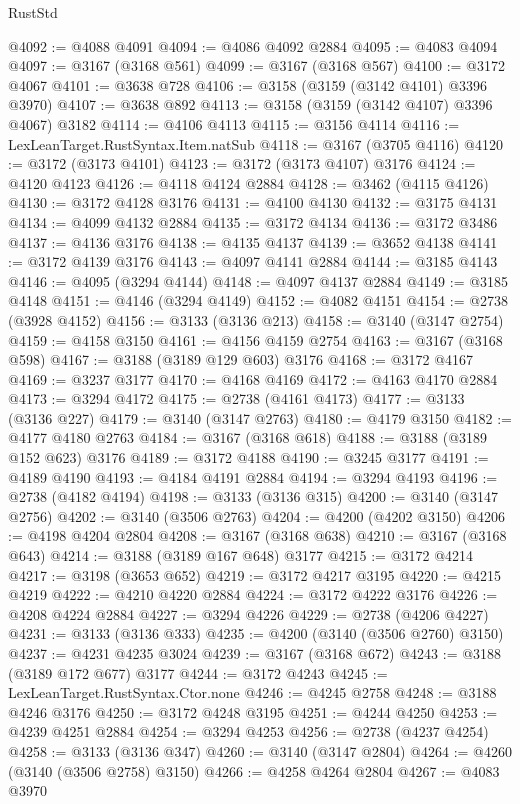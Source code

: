 \begin{lexlean}{RustStd}
\begin{coremodule}
@4092 := @4088 @4091
@4094 := @4086 @4092 @2884
@4095 := @4083 @4094
@4097 := @3167 (@3168 @561)
@4099 := @3167 (@3168 @567)
@4100 := @3172 @4067
@4101 := @3638 @728
@4106 := @3158 (@3159 (@3142 @4101) @3396 @3970)
@4107 := @3638 @892
@4113 := @3158 (@3159 (@3142 @4107) @3396 @4067) @3182
@4114 := @4106 @4113
@4115 := @3156 @4114
@4116 := LexLeanTarget.RustSyntax.Item.natSub
@4118 := @3167 (@3705 @4116)
@4120 := @3172 (@3173 @4101)
@4123 := @3172 (@3173 @4107) @3176
@4124 := @4120 @4123
@4126 := @4118 @4124 @2884
@4128 := @3462 (@4115 @4126)
@4130 := @3172 @4128 @3176
@4131 := @4100 @4130
@4132 := @3175 @4131
@4134 := @4099 @4132 @2884
@4135 := @3172 @4134
@4136 := @3172 @3486
@4137 := @4136 @3176
@4138 := @4135 @4137
@4139 := @3652 @4138
@4141 := @3172 @4139 @3176
@4143 := @4097 @4141 @2884
@4144 := @3185 @4143
@4146 := @4095 (@3294 @4144)
@4148 := @4097 @4137 @2884
@4149 := @3185 @4148
@4151 := @4146 (@3294 @4149)
@4152 := @4082 @4151
@4154 := @2738 (@3928 @4152)
@4156 := @3133 (@3136 @213)
@4158 := @3140 (@3147 @2754)
@4159 := @4158 @3150
@4161 := @4156 @4159 @2754
@4163 := @3167 (@3168 @598)
@4167 := @3188 (@3189 @129 @603) @3176
@4168 := @3172 @4167
@4169 := @3237 @3177
@4170 := @4168 @4169
@4172 := @4163 @4170 @2884
@4173 := @3294 @4172
@4175 := @2738 (@4161 @4173)
@4177 := @3133 (@3136 @227)
@4179 := @3140 (@3147 @2763)
@4180 := @4179 @3150
@4182 := @4177 @4180 @2763
@4184 := @3167 (@3168 @618)
@4188 := @3188 (@3189 @152 @623) @3176
@4189 := @3172 @4188
@4190 := @3245 @3177
@4191 := @4189 @4190
@4193 := @4184 @4191 @2884
@4194 := @3294 @4193
@4196 := @2738 (@4182 @4194)
@4198 := @3133 (@3136 @315)
@4200 := @3140 (@3147 @2756)
@4202 := @3140 (@3506 @2763)
@4204 := @4200 (@4202 @3150)
@4206 := @4198 @4204 @2804
@4208 := @3167 (@3168 @638)
@4210 := @3167 (@3168 @643)
@4214 := @3188 (@3189 @167 @648) @3177
@4215 := @3172 @4214
@4217 := @3198 (@3653 @652)
@4219 := @3172 @4217 @3195
@4220 := @4215 @4219
@4222 := @4210 @4220 @2884
@4224 := @3172 @4222 @3176
@4226 := @4208 @4224 @2884
@4227 := @3294 @4226
@4229 := @2738 (@4206 @4227)
@4231 := @3133 (@3136 @333)
@4235 := @4200 (@3140 (@3506 @2760) @3150)
@4237 := @4231 @4235 @3024
@4239 := @3167 (@3168 @672)
@4243 := @3188 (@3189 @172 @677) @3177
@4244 := @3172 @4243
@4245 := LexLeanTarget.RustSyntax.Ctor.none
@4246 := @4245 @2758
@4248 := @3188 @4246 @3176
@4250 := @3172 @4248 @3195
@4251 := @4244 @4250
@4253 := @4239 @4251 @2884
@4254 := @3294 @4253
@4256 := @2738 (@4237 @4254)
@4258 := @3133 (@3136 @347)
@4260 := @3140 (@3147 @2804)
@4264 := @4260 (@3140 (@3506 @2758) @3150)
@4266 := @4258 @4264 @2804
@4267 := @4083 @3970

\end{coremodule}
\end{lexlean}
